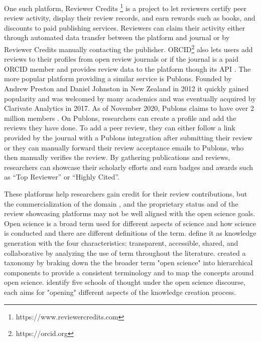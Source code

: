One such platform, Reviewer Credits \footnote{https://www.reviewercredits.com} is a project to let reviewers certify peer review activity, display their review records, and earn rewards such as books, and discounts to paid publishing services. Reviewers can claim their activity either through automated data transfer between the platform and journal or by Reviewer Credits manually contacting the publisher. \acrshort{ORCID}\footnote{https://orcid.org} also lets users add reviews to their profiles from open review journals or if the journal is a paid \acrshort{ORCID} member and provides review data to the platform though its \acrshort{API} \parencite{therese_2018}. The more popular platform providing a similar service is Publons. Founded by Andrew Preston and Daniel Johnston in New Zealand in 2012 it quickly gained popularity and was welcomed by many academics \parencite[266]{Smith.2015} and was eventually acquired by Clarivate Analytics in 2017. As of November 2020, Publons claims to have over 2 million members \parencite{publons_2020}. On Publons, researchers can create a profile and add the reviews they have done. To add a peer review, they can either follow a link provided by the journal with a Publons integration after submitting their review or they can manually forward their review acceptance emails to Publons, who then manually verifies the review. By gathering publications and reviews, researchers can showcase their scholarly efforts and earn badges and awards such as “Top Reviewer” or “Highly Cited”. 

These platforms help researchers gain credit for their review contributions, but the commercialization of the domain \parencite[14]{Tennant.2017}, and the proprietary status and of the review showcasing platforms may not be well aligned with the open science goals. Open science is a broad term used for different aspects of science and how science is conducted and there are different definitions of the term. \cite{VicenteSaez.2018} define it as knowledge generation with the four characteristics: transparent, accessible, shared, and collaborative by analyzing the use of term throughout the literature. \cite{Pontika.2015} created a taxonomy by braking down the the broader term "open science" into hierarchical components to provide a consistent terminology and to map the concepts around open science. \cite{Fecher.2013} identify five  schools of thought under the open science discourse, each aims for "opening" different aspects of the knowledge creation process. 

